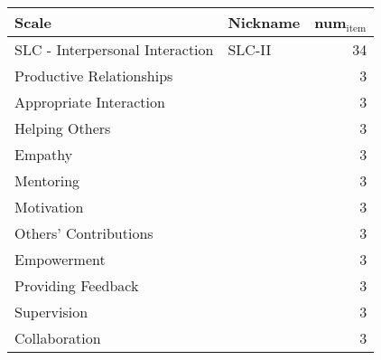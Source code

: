 \documentclass[11pt]{article}
\begin{document}
\begin{center}
\begin{tabular}{llr}
Scale & Nickname & num\(_{\text{item}}\)\\
\hline
SLC - Interpersonal Interaction & SLC-II & 34\\
\hline
Productive Relationships &  & 3\\
Appropriate Interaction &  & 3\\
Helping Others &  & 3\\
Empathy &  & 3\\
Mentoring &  & 3\\
Motivation &  & 3\\
Others’ Contributions &  & 3\\
Empowerment &  & 3\\
Providing Feedback &  & 3\\
Supervision &  & 3\\
Collaboration &  & 3\\
\end{tabular}
\end{center}
\end{document}

